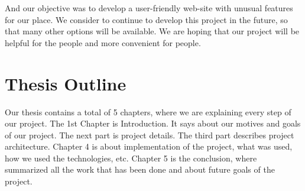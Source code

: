 And our objective was to develop a user-friendly web-site with unusual features for our place. We consider to continue to develop this project in the future, so that many other options will be available. We are hoping that our project will be helpful for the people and more convenient for people.

\section{Thesis Outline}
Our thesis contains a total of 5 chapters, where we are explaining every step of our project. The 1st Chapter is Introduction. It says about our motives and goals of our project. The next part is project details. The third part describes project architecture. Chapter 4 is about implementation of the project, what was used, how we used the technologies, etc. Chapter 5 is the conclusion, where summarized all the work that has been done and about future goals of the project. 


